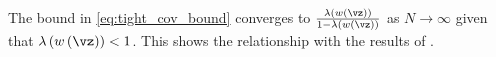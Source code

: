 \begin{proofEnd}


The bound in \cref{eq:tight_cov_bound} converges to \(\frac{\lambda\left(w\left(\vz\right)\right)}{1-\lambda\left(w\left(\vz\right)\right)}\) as \(N \rightarrow \infty\) given that \(\lambda\left(w\left(\vz\right)\right) < 1\).
This shows the relationship with the results of \citet[Theorem 3]{tan_monte_2006}.


\end{proofEnd}


